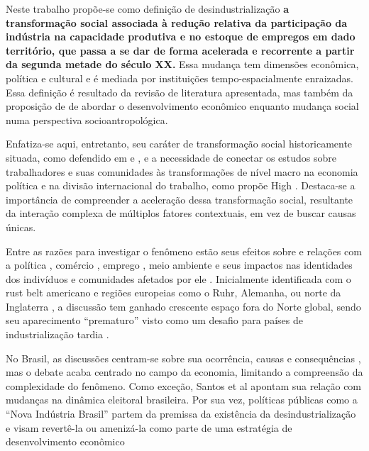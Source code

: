 Neste trabalho propõe-se como definição de desindustrialização \textbf{a
transformação social associada à redução relativa da participação da
indústria na capacidade produtiva e no estoque de empregos em dado
território, que passa a se dar de forma acelerada e recorrente a partir
da segunda metade do século XX.} Essa mudança tem dimensões econômica,
política e cultural e é mediada por instituições tempo-espacialmente
enraizadas. Essa definição é resultado da revisão de literatura
apresentada, mas também da proposição de
\citep{santos_desenvolvimento_2016} de
abordar o desenvolvimento econômico enquanto mudança social numa
perspectiva socioantropológica.

Enfatiza-se aqui, entretanto, seu caráter de transformação social
historicamente situada, como defendido em \citet{strangleman_deindustrialisation_2017} e \citet{lawson_making_2020}, e a
necessidade de conectar os estudos sobre trabalhadores e suas
comunidades às transformações de nível macro na economia política e na
divisão internacional do trabalho, como propõe High
.
Destaca-se a importância de compreender a aceleração dessa transformação
social, resultante da interação complexa de múltiplos fatores
contextuais, em vez de buscar causas únicas.

Entre as razões para investigar o fenômeno estão seus efeitos sobre e
relações com a política
\citep{iversen_causes_2000}, comércio
\citep{alderson_explaining_1999,alderson_globalization_2002}, emprego
\citep{beatty_long_2020,tomlinson_-industrialization_2020}, meio ambiente
\citep{feltrin_noxious_2022} e seus impactos nas identidades dos indivíduos e comunidades
afetados por ele
\citep{linkon_half-life_2018,mah_industrial_2012,nayak_displaced_2006,perchard_broken_2013}. Inicialmente identificada com o
rust belt americano e regiões europeias como o Ruhr, Alemanha, ou norte
da Inglaterra \citep{emery_geographies_2019,high_wounds_2013,strangleman_introduction_2013}, a discussão tem
ganhado crescente espaço fora do Norte global, sendo seu aparecimento
``prematuro'' visto como um desafio para países de industrialização
tardia \citep{rodrik_premature_2016}.

No Brasil, as discussões centram-se sobre sua ocorrência, causas e
consequências , mas o debate acaba centrado no campo da
economia, limitando a compreensão da complexidade do fenômeno. Como
exceção, Santos et al
 apontam sua relação com mudanças na dinâmica eleitoral
brasileira. Por sua vez, políticas públicas como a ``Nova Indústria
Brasil'' partem da premissa da existência da desindustrialização e visam
revertê-la ou amenizá-la como parte de uma estratégia de desenvolvimento
econômico \citep[p.~5]{cndi_nova_2024}

